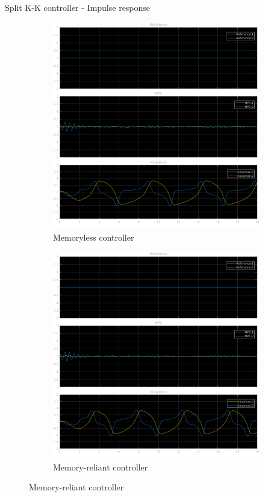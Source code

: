 \documentclass{beamer}
\begin{document}
\begin{frame}{Split K-K controller - Impulse response}
    \begin{figure}
        \centering
        \begin{subfigure}[b]{0.45\textwidth}
            \centering
            \includegraphics[width=\textwidth]{Undelayed_Split_Pulse.png}
            \caption{Memoryless controller}
        \end{subfigure}
        \hfill
        \begin{subfigure}[b]{0.45\textwidth}
            \centering
            \includegraphics[width=\textwidth]{Delayed_Split_Pulse.png}
            \caption{Memory-reliant controller}
        \end{subfigure}
    \end{figure}
\end{frame}
\end{document}
